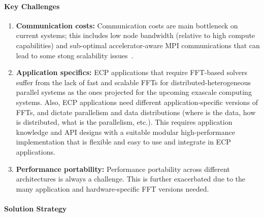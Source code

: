 \paragraph{Key  Challenges}
\begin{enumerate}
\item
\textbf{Communication costs:}
Communication costs are main bottleneck 
on current systems; this includes low node bandwidth (relative to 
high compute capabilities) and sub-optimal accelerator-aware MPI 
communications that can lead to some stong scalability issues~\cite{heffte-pact21}.

\item
\textbf{Application specifics:}
ECP applications that require FFT-based solvers suffer from the lack of fast 
and scalable FFTs for distributed-heterogeneous parallel systems 
as the ones projected for the upcoming exascale computing systems. Also, ECP 
applications need different application-specific versions of FFTs,
and dictate parallelism and data distributions (where is the data, how is 
distributed, what is the parallelism, etc.). This requires application
knowledge and API designs with a suitable modular high-performance 
implementation that is flexible and easy to use and integrate in ECP applications.

\item
\textbf{Performance portability:}
Performance portability across different architectures is always a challenge.
This is further exacerbated due to the many application and 
hardware-specific FFT versions needed.
\end{enumerate}

\paragraph{Solution Strategy}

